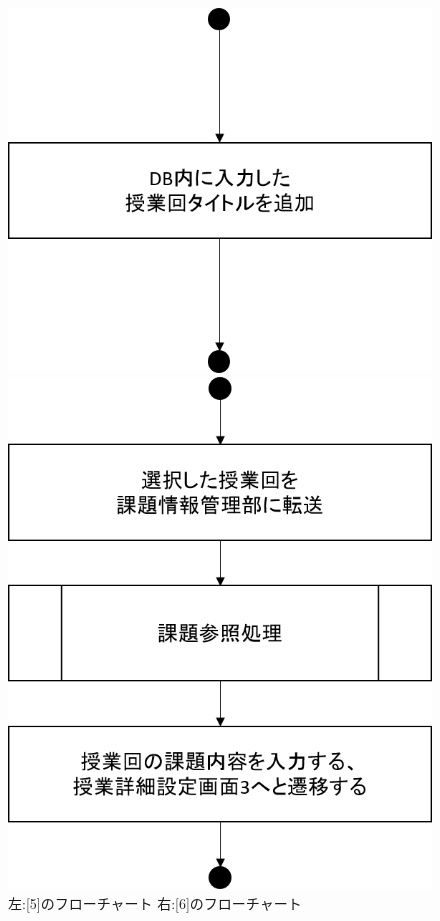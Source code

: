 \begin{figure}[htbp]
 \begin{minipage}{0.5\hsize}
  \begin{center}
   \includegraphics[width=0.5\linewidth,clip]{./img/create_lecture/sub5.png}
  \end{center}
 \end{minipage}
 \begin{minipage}{0.5\hsize}
  \begin{center}
   \includegraphics[width=0.5\linewidth,clip]{./img/create_lecture/sub6.png}
  \end{center}
 \end{minipage}
 \caption{左:[5]のフローチャート 右:[6]のフローチャート}\label{fig:createlectureflow2}
\end{figure}

